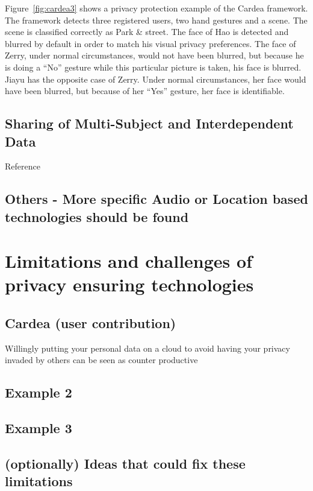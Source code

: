 \documentclass[conference]{IEEEtran}
\begin{document}
Figure~\ref{fig:cardea3} shows a privacy protection example of the Cardea framework. The framework detects three registered users, two hand gestures and a scene. The scene is classified correctly as Park \& street. The face of Hao is detected and blurred by default in order to match his visual privacy preferences. The face of Zerry, under normal circumstances, would not have been blurred, but because he is doing a “No” gesture while this particular picture is taken, his face is blurred. Jiayu has the opposite case of Zerry. Under normal circumstances, her face would have been blurred, but because of her “Yes” gesture, her face is identifiable.

\subsection{Sharing of Multi-Subject and Interdependent Data}
Reference \cite{olteanu2018consensual}

\subsection{Others - More specific Audio or Location based technologies should be found}

\section{Limitations and challenges of privacy ensuring technologies}\label{Limitations}

\subsection{Cardea (user contribution)}
Willingly putting your personal data on a cloud to avoid having your privacy invaded by others can be seen as counter productive

\subsection{Example 2}

\subsection{Example 3}

\subsection{(optionally) Ideas that could fix these limitations}
\end{document}
